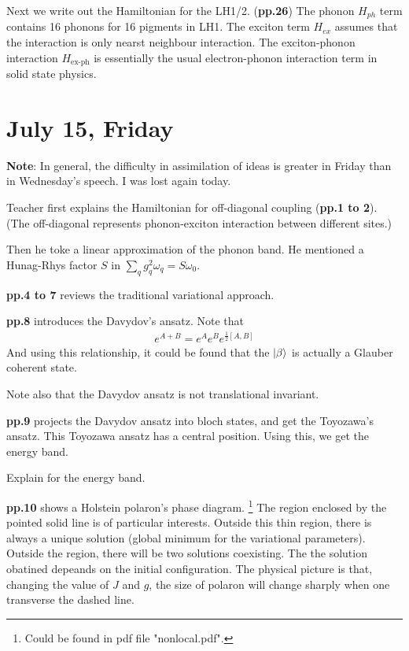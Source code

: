 \documentclass{article}
\numberwithin{equation}{subsection} %
\theoremstyle{definition}
\begin{document}
Next we write out the Hamiltonian for the LH1/2. (\textbf{pp.26})
The phonon $H_{ph}$ term 
contains 16 phonons for 16 pigments in LH1. The exciton term $H_{ex}$
assumes that the interaction is only nearst neighbour interaction.
The exciton-phonon interaction $H_{\text{ex-ph}}$ is essentially
the usual electron-phonon interaction term in solid state physics.
\section{July 15, Friday}
\label{sec:July_15}

\textbf{Note}: In general, the difficulty in assimilation of ideas is
greater in Friday than in Wednesday's speech. I was lost again today. 

Teacher first explains the Hamiltonian for off-diagonal coupling
(\textbf{pp.1 to 2}). (The off-diagonal represents phonon-exciton
interaction between different sites.)

Then he toke a linear approximation of the phonon band. He mentioned
a Hunag-Rhys factor $S$ in $\sum_q g_q^2 \omega_q = S\omega_0$.

\textbf{pp.4 to 7} reviews the traditional variational approach.

\textbf{pp.8} introduces the Davydov's ansatz.
Note that
\begin{align*}
    e^{A+B} = e^A e^B e^{\frac{1}{2}[A,B]}
\end{align*}
And using this relationship, it could be found that the $\ket{\beta}$
is actually a Glauber coherent state.

Note also that the Davydov ansatz is not translational invariant. 

\textbf{pp.9} projects the Davydov ansatz into bloch states, and get
the Toyozawa's ansatz. This Toyozawa ansatz has a central
position. Using this, we get the energy band.

Explain for the energy band.

\textbf{pp.10 }shows a Holstein polaron's phase diagram. 
\footnote{Could be found in pdf file "nonlocal.pdf".}
The region enclosed by the pointed solid line is of particular
interests. Outside this thin region,
there is always a unique solution (global minimum for the variational
parameters). 
Outside the region, there will be two solutions coexisting.
The the solution obatined depeands on the initial configuration.
The physical picture is that, changing the value of $J$ and $g$,
the size of polaron will change sharply when one transverse the
dashed line.
\end{document}
